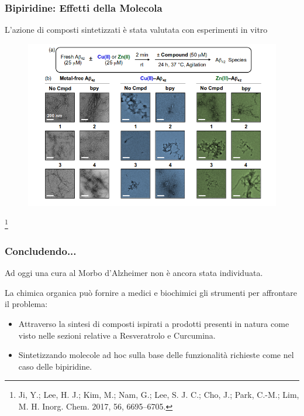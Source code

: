\documentclass[9pt]{beamer}
\newcommand\blfootnote[1]{%
	\begingroup
	\renewcommand\thefootnote{}\footnote{#1}%
	\addtocounter{footnote}{-1}%
	\endgroup
}
\begin{document}
\begin{frame}
	\frametitle{Bipiridine: Effetti della Molecola}
	L'azione di composti sintetizzati è stata valutata con esperimenti in vitro

	\begin{figure}
		\includegraphics[scale=1.5]{immagini/ris_bpy2.png}
	\end{figure}
	\blfootnote{Ji, Y.; Lee, H. J.; Kim, M.; Nam, G.; Lee, S. J. C.; Cho, J.; Park, C.-M.; Lim, M. H. Inorg. Chem. 2017,
		56, 6695–6705.}
\end{frame}

\begin{frame}
	\frametitle{Concludendo...}
	Ad oggi una cura al Morbo d'Alzheimer non è ancora stata individuata.

	La chimica organica può fornire a medici e biochimici gli strumenti per affrontare il problema:
	\begin{itemize}

		\item Attraverso la sintesi di composti ispirati a prodotti 	presenti in natura come visto nelle sezioni relative a Resveratrolo e Curcumina.
		\item Sintetizzando molecole ad hoc sulla base delle funzionalità richieste come nel caso delle bipiridine.

	\end{itemize}
\end{frame}
\end{document}
